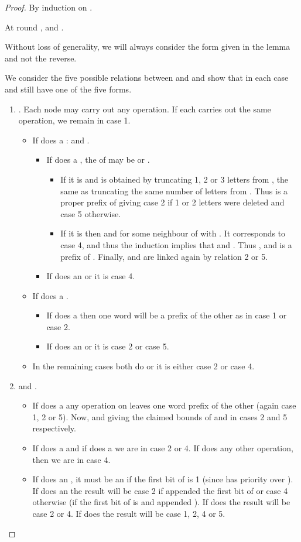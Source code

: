 \documentclass[11pt,envcountsame,letterpaper]{llncs}
\begin{document}
\begin{proof}
By induction on .

At round ,  and .

Without loss of generality, we will always consider the form given in the
lemma and not the reverse.



We consider the five possible relations between   and 
and show that in each case   and   still have one of the five
forms.
\begin{enumerate}
\item .
Each node may carry out any operation. If each carries
 out the same  operation, we remain in case 1. 
\begin{itemize}
\item If  does a :  and .
\begin{itemize}
\item If   does a , the 
 of  may be  or . 
\begin{itemize}
\item If it is 
 and  is obtained by truncating 1, 2 or 3 letters from
, the same as truncating the same number of letters from .
Thus  is a proper prefix of  giving case 2 if 1 or 2 letters were
deleted and case 5 otherwise.
\item If it is  then
 and  for some neighbour  of  with
. 
It corresponds to case 4, and thus the induction implies that
 and .
Thus ,  and  is a prefix
of . Finally, 
and  are linked again by relation 2 or 5.
\end{itemize}
\item If  does  an  or  it is case 4.
\end{itemize}

\item If  does a .
\begin{itemize}
\item If   does a  then one word will be a prefix of 
the other as in case 1 or case 2.
\item If  does an  or  it is case 2 or case 5.
\end{itemize}
\item  In the remaining cases both do  or  it is either case 2 
or case 4.
\end{itemize}

\item  and . 
\begin{itemize}
\item
 If  does a  any operation on  leaves one
word prefix of the other (again case 1, 2 or 5). 
Now,  and  giving the claimed bounds of  and  in cases 2 and 5 respectively.
\item If  does a  and if   does a 
we are in case 2 or 4. 
If  does any other operation, then we are in case 4.
\item If  does an , it must be an  if the first bit 
of  is 1 (since  has priority over ).
If  does an   the result will be case 2
if  appended the first bit of  or case 4 otherwise (if the first bit of  is  and  appended ).
If  does  the result will be case 2 or 4.
If  does  the result will be case 1, 2, 4 or 5.
\end{itemize}


\end{enumerate}
\end{proof}
\end{document}
